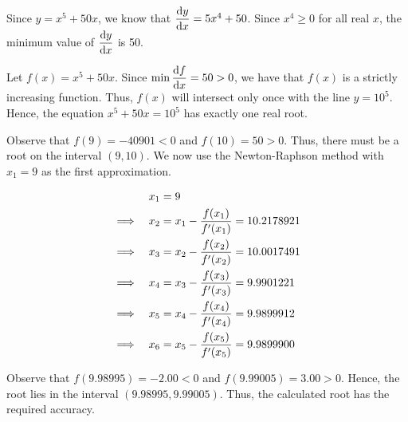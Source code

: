\documentclass{echw}
\begin{document}
    \solution
        Since $y = x^5 + 50x$, we know that $\dfrac{\mathrm{d} y}{\mathrm{d} x} = 5x^4 + 50$. Since $x^4 \geq 0$ for all real $x$, the minimum value of $\dfrac{\mathrm{d} y}{\mathrm{d} x}$ is 50.


        Let $f(x) = x^5 + 50x$. Since $\min \dfrac{\mathrm{d} f}{\mathrm{d} x} = 50 > 0$, we have that $f(x)$ is a strictly increasing function. Thus, $f(x)$ will intersect only once with the line $y = 10^5$. Hence, the equation $x^5 + 50x = 10^5$ has exactly one real root.

        Observe that $f(9) = -40901 < 0$ and $f(10) = 50 > 0$. Thus, there must be a root on the interval $(9, 10)$. We now use the Newton-Raphson method with $x_1 = 9$ as the first approximation.

        \begin{alignat*}{2}
            && x_1 &= 9 \\
            \implies&&x_2 &= x_1 - \dfrac{f(x_1)}{f^\prime(x_1)} = 10.2178921 \\
            \implies&&x_3 &= x_2 - \dfrac{f(x_2)}{f^\prime(x_2)} = 10.0017491 \\
            \implies&&x_4 &= x_3 - \dfrac{f(x_3)}{f^\prime(x_3)} = 9.9901221 \\
            \implies&&x_5 &= x_4 - \dfrac{f(x_4)}{f^\prime(x_4)} = 9.9899912 \\
            \implies&&x_6 &= x_5 - \dfrac{f(x_5)}{f^\prime(x_5)} = 9.9899900 
        \end{alignat*}


        Observe that $f(9.98995) = -2.00 < 0$ and $f(9.99005) = 3.00 > 0$. Hence, the root lies in the interval $(9.98995, 9.99005)$. Thus, the calculated root has the required accuracy.
\end{document}
